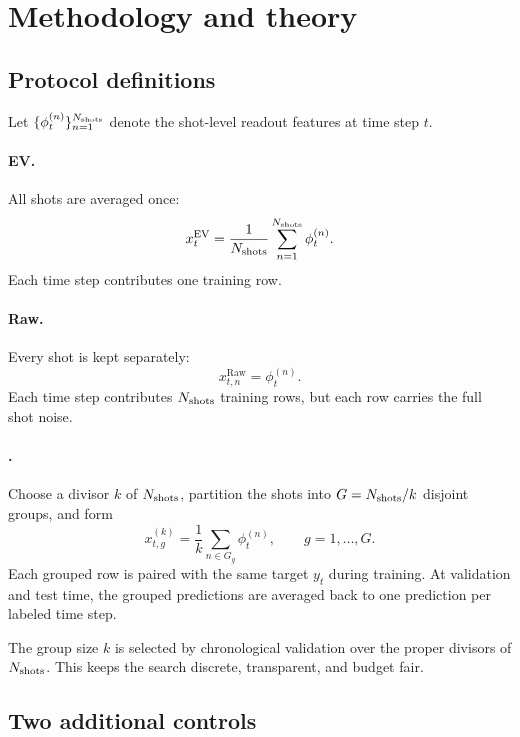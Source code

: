 \section{Methodology and theory}
\label{sec:methodology}

\subsection{Protocol definitions}

Let $\{\phi_t^{(n)}\}_{n=1}^{N_{\mathrm{shots}}}$ denote the shot-level readout features at time step $t$.

\paragraph*{EV.}
All shots are averaged once:
\begin{equation}
x_t^{\mathrm{EV}} = \frac{1}{N_{\mathrm{shots}}}\sum_{n=1}^{N_{\mathrm{shots}}} \phi_t^{(n)}.
\end{equation}
Each time step contributes one training row.

\paragraph*{Raw.}
Every shot is kept separately:
\begin{equation}
x_{t,n}^{\mathrm{Raw}} = \phi_t^{(n)}.
\end{equation}
Each time step contributes $N_{\mathrm{shots}}$ training rows, but each row carries the full shot noise.

\paragraph*{\Split{}.}
Choose a divisor $k$ of $N_{\mathrm{shots}}$, partition the shots into $G=N_{\mathrm{shots}}/k$ disjoint groups, and form
\begin{equation}
x_{t,g}^{(k)} = \frac{1}{k}\sum_{n\in G_g}\phi_t^{(n)}, \qquad g=1,\dots,G.
\label{eq:splitdef}
\end{equation}
Each grouped row is paired with the same target $y_t$ during training. At validation and test time, the grouped predictions are averaged back to one prediction per labeled time step.

The group size $k$ is selected by chronological validation over the proper divisors of $N_{\mathrm{shots}}$. This keeps the search discrete, transparent, and budget fair.

\subsection{Two additional controls}


